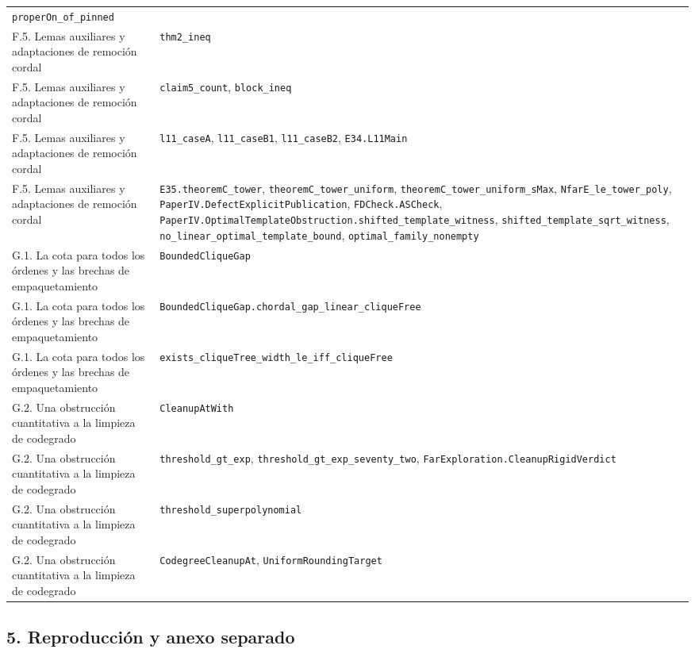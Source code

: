 \documentclass[spanish,11pt,a4paper]{article}
\newcounter{none}
\begin{document}
{\begin{longtable}[]{@{}
  >{\raggedright\arraybackslash}p{}
  >{\raggedright\arraybackslash}p{}@{}}
\nolinkurl{properOn_of_pinned} \\
F.5. Lemas auxiliares y adaptaciones de remoción cordal &
\nolinkurl{thm2_ineq} \\
F.5. Lemas auxiliares y adaptaciones de remoción cordal &
\nolinkurl{claim5_count}, \nolinkurl{block_ineq} \\
F.5. Lemas auxiliares y adaptaciones de remoción cordal &
\nolinkurl{l11_caseA}, \nolinkurl{l11_caseB1}, \nolinkurl{l11_caseB2},
\nolinkurl{E34.L11Main} \\
F.5. Lemas auxiliares y adaptaciones de remoción cordal &
\nolinkurl{E35.theoremC_tower}, \nolinkurl{theoremC_tower_uniform},
\nolinkurl{theoremC_tower_uniform_sMax},
\nolinkurl{NfarE_le_tower_poly},
\nolinkurl{PaperIV.DefectExplicitPublication}, \nolinkurl{FDCheck.ASCheck},
\nolinkurl{PaperIV.OptimalTemplateObstruction.shifted_template_witness},
\nolinkurl{shifted_template_sqrt_witness},
\nolinkurl{no_linear_optimal_template_bound},
\nolinkurl{optimal_family_nonempty} \\
G.1. La cota para todos los órdenes y las brechas de empaquetamiento &
\nolinkurl{BoundedCliqueGap} \\
G.1. La cota para todos los órdenes y las brechas de empaquetamiento &
\nolinkurl{BoundedCliqueGap.chordal_gap_linear_cliqueFree} \\
G.1. La cota para todos los órdenes y las brechas de empaquetamiento &
\nolinkurl{exists_cliqueTree_width_le_iff_cliqueFree} \\
G.2. Una obstrucción cuantitativa a la limpieza de codegrado &
\nolinkurl{CleanupAtWith} \\
G.2. Una obstrucción cuantitativa a la limpieza de codegrado &
\nolinkurl{threshold_gt_exp}, \nolinkurl{threshold_gt_exp_seventy_two},
\nolinkurl{FarExploration.CleanupRigidVerdict} \\
G.2. Una obstrucción cuantitativa a la limpieza de codegrado &
\nolinkurl{threshold_superpolynomial} \\
G.2. Una obstrucción cuantitativa a la limpieza de codegrado &
\nolinkurl{CodegreeCleanupAt}, \nolinkurl{UniformRoundingTarget} \\
\end{longtable}
}

\subsection{5. Reproducción y anexo
separado}\label{reproducciuxf3n-y-anexo-separado}
\end{document}

